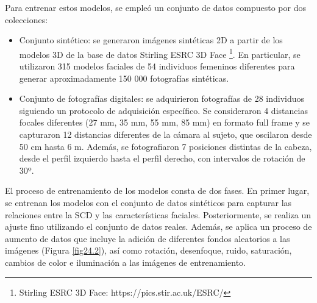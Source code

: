 Para entrenar estos modelos, se empleó un conjunto de datos compuesto por dos colecciones: 

\begin{itemize}
	\item Conjunto sintético: se generaron imágenes sintéticas 2D a partir de los modelos 3D de la base de datos Stirling ESRC 3D Face \footnote{Stirling ESRC 3D Face: https://pics.stir.ac.uk/ESRC/}. En particular, se utilizaron 315 modelos faciales de 54 individuos femeninos diferentes para generar aproximadamente 150 000 fotografías sintéticas.
	\item Conjunto de fotografías digitales: se adquirieron fotografías de 28 individuos siguiendo un protocolo de adquisición específico. Se consideraron 4 distancias focales diferentes (27 mm, 35 mm, 55 mm, 85 mm) en formato full frame y se capturaron 12 distancias diferentes de la cámara al sujeto, que oscilaron desde 50 cm hasta 6 m. Además, se fotografiaron 7 posiciones distintas de la cabeza, desde el perfil izquierdo hasta el perfil derecho, con intervalos de rotación de 30º. 
\end{itemize}


El proceso de entrenamiento de los modelos consta de dos fases. En primer lugar, se entrenan los modelos con el conjunto de datos sintéticos para capturar las relaciones entre la SCD y las características faciales. Posteriormente, se realiza un ajuste fino utilizando el conjunto de datos reales. Además, se aplica un proceso de aumento de datos que incluye la adición de diferentes fondos aleatorios a las imágenes (Figura \ref{fig24.2}), así como rotación, desenfoque, ruido, saturación, cambios de color e iluminación a las imágenes de entrenamiento.

